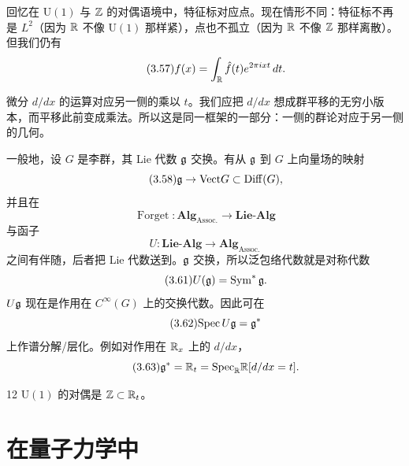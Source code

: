 回忆在 $\mathrm{U}(1)$ 与 $\mathbb{Z}$ 的对偶语境中，特征标对应点。现在情形不同：特征标不再是 $L^2$（因为 $\mathbb{R}$ 不像 $\mathrm{U}(1)$ 那样紧），点也不孤立（因为 $\mathbb{R}$ 不像 $\mathbb{Z}$ 那样离散）。但我们仍有
\begin{equation}\tag{3.57}
f(x)=\int_{\mathbb{R}}\hat f(t)e^{2\pi ixt}\,dt.
\end{equation}

微分 $d/dx$ 的运算对应另一侧的乘以 $t$。我们应把 $d/dx$ 想成群平移的无穷小版本，而平移此前变成乘法。所以这是同一框架的一部分：一侧的群论对应于另一侧的几何。

一般地，设 $G$ 是李群，其 Lie 代数 $\mathfrak{g}$ 交换。有从 $\mathfrak{g}$ 到 $G$ 上向量场的映射
\begin{equation}\tag{3.58}
\mathfrak{g}\to\mathrm{Vect} G\subset\mathrm{Diff}(G),
\end{equation}
并且在
\begin{equation}\tag{3.59}
\operatorname{Forget}\colon \mathbf{Alg}_{\mathrm{Assoc.}}\to\mathbf{Lie}\text{-}\mathbf{Alg}
\end{equation}
与函子
\begin{equation}\tag{3.60}
U\colon \mathbf{Lie}\text{-}\mathbf{Alg}\to\mathbf{Alg}_{\mathrm{Assoc.}}
\end{equation}
之间有伴随，后者把 Lie 代数送到。$\mathfrak{g}$ 交换，所以泛包络代数就是对称代数
\begin{equation}\tag{3.61}
U(\mathfrak{g})=\operatorname{Sym}^{*}\mathfrak{g}.
\end{equation}
$U\mathfrak{g}$ 现在是作用在 $C^{\infty}(G)$ 上的交换代数。因此可在
\begin{equation}\tag{3.62}
\mathrm{Spec}\,U\mathfrak{g}=\mathfrak{g}^{*}
\end{equation}
上作谱分解/层化。例如对作用在 $\mathbb{R}_x$ 上的 $d/dx$，
\begin{equation}\tag{3.63}
\mathfrak{g}^{*}=\mathbb{R}_t=\mathrm{Spec}_{\mathbb{R}}\mathbb{R}[d/dx=t].
\end{equation}

\begin{srcex}{12}
$\mathrm{U}(1)$ 的对偶是 $\mathbb{Z}\subset\mathbb{R}_t$。
\end{srcex}

\section{在量子力学中}

